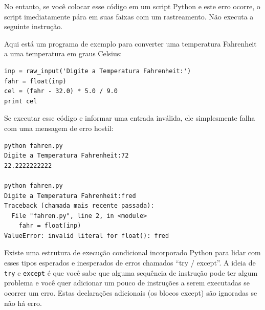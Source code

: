 No entanto, se você colocar esse código em um
script Python e este erro ocorre, o script imediatamente
pára em suas faixas com um rastreamento.
Não executa a seguinte instrução.



Aqui está um programa de exemplo para converter uma temperatura Fahrenheit
a uma temperatura em graus Celsius:


\beforeverb
\begin{verbatim}
inp = raw_input('Digite a Temperatura Fahrenheit:')
fahr = float(inp)
cel = (fahr - 32.0) * 5.0 / 9.0
print cel
\end{verbatim}
\afterverb
%

Se executar esse código e informar uma entrada inválida, ele simplesmente falha
com uma mensagem de erro hostil:


\beforeverb
\begin{verbatim}
python fahren.py 
Digite a Temperatura Fahrenheit:72
22.2222222222

python fahren.py 
Digite a Temperatura Fahrenheit:fred
Traceback (chamada mais recente passada):
  File "fahren.py", line 2, in <module>
    fahr = float(inp)
ValueError: invalid literal for float(): fred
\end{verbatim}

\afterverb
%

Existe uma estrutura de execução condicional incorporado
Python para lidar com esses tipos esperados e inesperados de
erros chamados ``try / except''. A ideia de {\tt try}
e {\tt except} é que você sabe que alguma sequência
de instrução pode ter algum problema e você quer
adicionar um pouco de instruções a serem executadas se ocorrer um erro.
Estas declarações adicionais (os blocos except) são ignoradas
se não há erro.

